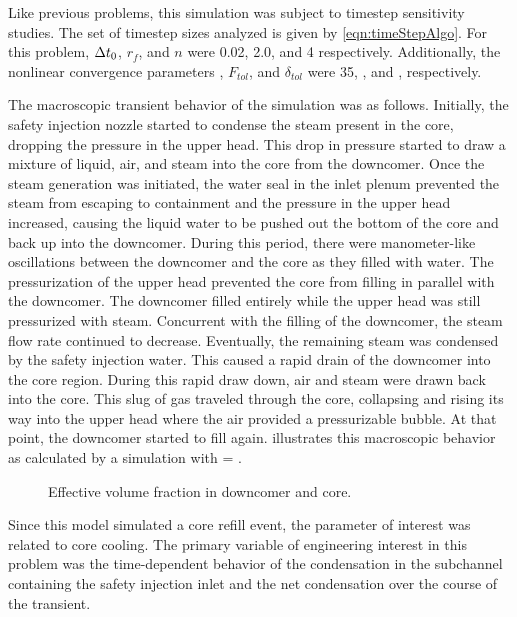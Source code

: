 Like previous problems, this simulation was subject to timestep sensitivity studies.
The set of timestep sizes analyzed is given by \eqref{eqn:timeStepAlgo}.
For this problem, $\dt{}_{0}$, $r_{f}$, and ${n}$ were 0.02, 2.0, and 4 respectively.
Additionally, the nonlinear convergence parameters \kmax{}, $F_{tol}$, and $\delta_{tol}$ were 35, , and , respectively.

The macroscopic transient behavior of the simulation was as follows.
Initially, the safety injection nozzle started to condense the steam present in the core, dropping the pressure in the upper head.
This drop in pressure started to draw a mixture of liquid, air, and steam into the core from the downcomer.
Once the steam generation was initiated, the water seal in the inlet plenum prevented the steam from escaping to containment and the pressure in the upper head increased, causing the liquid water to be pushed out the bottom of the core and back up into the downcomer.
During this period, there were manometer-like oscillations between the downcomer and the core as they filled with water.
The pressurization of the upper head prevented the core from filling in parallel with the downcomer.
The downcomer filled entirely while the upper head was still pressurized with steam.
Concurrent with the filling of the downcomer, the steam flow rate continued to decrease.
Eventually, the remaining steam was condensed by the safety injection water.
This caused a rapid drain of the downcomer into the core region.
During this rapid draw down, air and steam were drawn back into the core.
This slug of gas traveled through the core, collapsing and rising its way into the upper head where the air provided a pressurizable bubble.
At that point, the downcomer started to fill again.
 illustrates this macroscopic behavior as calculated by a simulation with \dtmax{} = .

\begin{figure}[h!tb]
\centering

\caption{Effective volume fraction in downcomer and core.}
\label{fig:refillCoreVolFracDom}
\end{figure}

Since this model simulated a core refill event, the parameter of interest was related to core cooling.
The primary variable of engineering interest in this problem was the time-dependent behavior of the condensation in the subchannel containing the safety injection inlet and the net condensation over the course of the transient.

